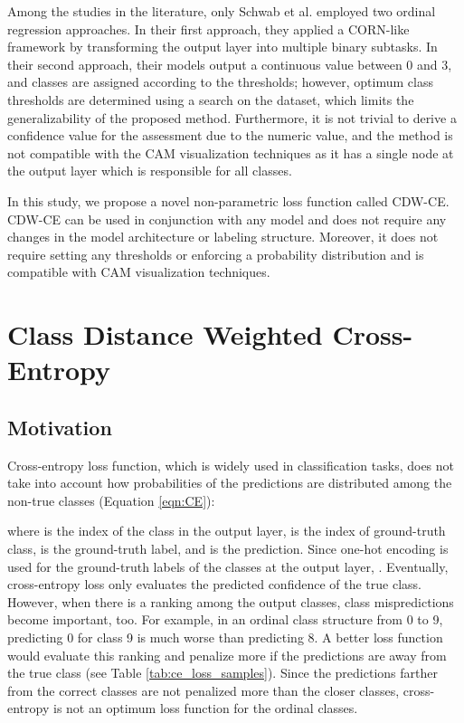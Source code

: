 \documentclass[runningheads]{llncs}
\begin{document}
Among the studies in the literature, only Schwab et al. \cite{schwab2021automatic} employed two ordinal regression approaches. In their first approach, they applied a CORN-like framework by transforming the output layer into multiple binary subtasks. In their second approach, their models output a continuous value between 0 and 3, and classes are assigned according to the thresholds; however, optimum class thresholds are determined using a search on the dataset, which limits the generalizability of the proposed method. Furthermore, it is not trivial to derive a confidence value for the assessment due to the numeric value, and the method is not compatible with the CAM visualization techniques as it has a single node at the output layer which is responsible for all classes.

In this study, we propose a novel non-parametric loss function called CDW-CE. CDW-CE can be used in conjunction with any model and does not require any changes in the model architecture or labeling structure. Moreover, it does not require setting any thresholds or enforcing a probability distribution and is compatible with CAM visualization techniques.

\section{Class Distance Weighted Cross-Entropy}
\subsection{Motivation}

Cross-entropy loss function, which is widely used in classification tasks, does not take into account how probabilities of the predictions are distributed among the non-true classes (Equation \ref{eqn:CE}):





\noindent where  is the index of the class in the output layer,  is the index of ground-truth class,  is the ground-truth label, and  is the prediction. Since one-hot encoding is used for the ground-truth labels of the classes at the output layer,  . Eventually, cross-entropy loss only evaluates the predicted confidence of the true class. However, when there is a ranking among the output classes, class mispredictions become important, too. For example, in an ordinal class structure from 0 to 9, predicting 0 for class 9 is much worse than predicting 8. A better loss function would evaluate this ranking and penalize more if the predictions are away from the true class (see Table \ref{tab:ce_loss_samples}). Since the predictions farther from the correct classes are not penalized more than the closer classes, cross-entropy is not an optimum loss function for the ordinal classes.
\end{document}
